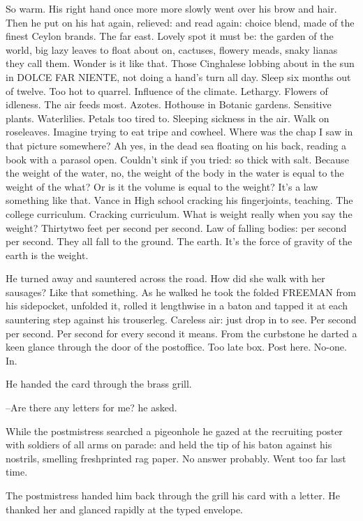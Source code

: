 So warm. His right hand once more more slowly went over his brow and
hair. Then he put on his hat again, relieved: and read again: choice
blend, made of the finest Ceylon brands. The far east. Lovely spot it
must be: the garden of the world, big lazy leaves to float about on,
cactuses, flowery meads, snaky lianas they call them. Wonder is it like
that. Those Cinghalese lobbing about in the sun in DOLCE FAR NIENTE, not
doing a hand's turn all day. Sleep six months out of twelve. Too hot to
quarrel. Influence of the climate. Lethargy. Flowers of idleness. The air
feeds most. Azotes. Hothouse in Botanic gardens. Sensitive plants.
Waterlilies. Petals too tired to. Sleeping sickness in the air. Walk on
roseleaves. Imagine trying to eat tripe and cowheel. Where was the chap I
saw in that picture somewhere? Ah yes, in the dead sea floating on his
back, reading a book with a parasol open. Couldn't sink if you tried: so
thick with salt. Because the weight of the water, no, the weight of the
body in the water is equal to the weight of the what? Or is it the volume
is equal to the weight? It's a law something like that. Vance in High
school cracking his fingerjoints, teaching. The college curriculum.
Cracking curriculum. What is weight really when you say the weight?
Thirtytwo feet per second per second. Law of falling bodies: per second
per second. They all fall to the ground. The earth. It's the force of
gravity of the earth is the weight.

He turned away and sauntered across the road. How did she walk with her
sausages? Like that something. As he walked he took the folded FREEMAN
from his sidepocket, unfolded it, rolled it lengthwise in a baton and
tapped it at each sauntering step against his trouserleg. Careless air:
just drop in to see. Per second per second. Per second for every second
it means. From the curbstone he darted a keen glance through the door of
the postoffice. Too late box. Post here. No-one. In.

He handed the card through the brass grill.

--Are there any letters for me? he asked.

While the postmistress searched a pigeonhole he gazed at the recruiting
poster with soldiers of all arms on parade: and held the tip of his baton
against his nostrils, smelling freshprinted rag paper. No answer
probably. Went too far last time.

The postmistress handed him back through the grill his card with a
letter. He thanked her and glanced rapidly at the typed envelope.


